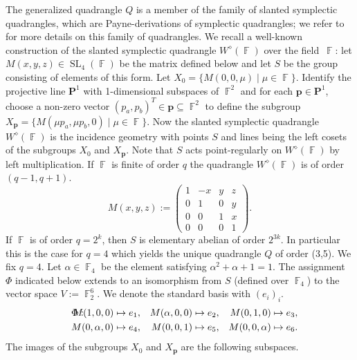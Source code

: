 \documentclass[dvipsnames]{article}
\theoremstyle{definition}
\theoremstyle{remark}
\DeclareMathOperator{\FF}{\mathbb F}
\DeclareMathOperator{\SL}{SL}
\begin{document}
    The generalized quadrangle $Q$ is a member of the family of slanted symplectic quadrangles, which are Payne-derivations of symplectic quadrangles; we refer to \cite{GrundhoferJoswigStroppel} for more details on this family of quadrangles. 
    We recall a well-known construction of the slanted symplectic quadrangle $W^\diamond(\FF)$ over the field~$\FF$:
    let $M(x,y,z) \in \SL_4(\FF)$ be the matrix defined below and let $S$ be the group consisting of elements of this form. 
    Let $X_0 = \{M(0,0,\mu) \mid \mu \in \FF\}$.
    Identify the projective line $\textbf{P}^1$ with 1-dimensional subspaces of $\FF^2$ and for each $\textbf{p} \in \textbf{P}^1$, choose a non-zero vector $(p_a,p_b)^T \in \textbf{p} \subseteq \FF^2$ to define the subgroup $X_{\textbf{p}} = \{M(\mu p_a, \mu p_b, 0) \mid \mu \in \FF\}$.
    Now the slanted symplectic quadrangle $W^\diamond(\FF)$ is the incidence geometry with points $S$ and lines being the left cosets of the subgroups $X_0$ and $X_{\textbf{p}}$.
    Note that $S$ acts point-regularly on $W^\diamond(\FF)$ by left multiplication. If $\FF$ is finite of order $q$ the quadrangle $W^\diamond(\FF)$ is of order $(q-1, q+1)$.
    \[
    M(x,y,z) :=
    \left(
        \begin{matrix}
            1 & -x & y & z \\
            0 & 1  & 0 & y \\
            0 & 0  & 1 & x \\
            0 & 0  & 0 & 1
        \end{matrix}
    \right).
    \]
    If $\FF$ is of order $q = 2^k$, then $S$ is elementary abelian of order $2^{3k}$.
    In particular this is the case for $q=4$ which yields the unique quadrangle $Q$ of order (3,5). 
    We fix $q=4$. Let $\alpha \in \FF_4$ be the element satisfying $\alpha^2+\alpha+1=1$. The assignment $\Phi$ indicated below extends to an isomorphism from $S$ (defined over $\FF_4$) to the vector space $V:= \FF_2^6$. We denote the standard basis with $(e_i)_i$.
    \begin{align*}
        \Phi:\hspace{-8mm} &&
        M(1,0,0)
        &\mapsto e_1, 
        &
        M(\alpha, 0,0)
        & \mapsto e_2,
        &
        M(0,1,0)
        & \mapsto e_3,\\
        && 
        M(0,\alpha,0)
        &\mapsto e_4,
        &
        M(0,0,1)
        &\mapsto e_5,
        &
        M(0,0,\alpha)
        &\mapsto e_6.
    \end{align*}
    The images of the subgroups $X_0$ and $X_{\textbf{p}}$ are the following subspaces.
\end{document}
